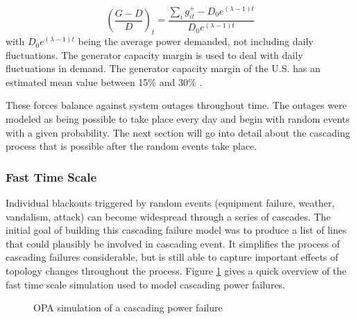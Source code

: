 \begin{enumerate}
\begin{equation}
\left(\frac{G-D}{D}\right)_t = \frac{\sum_i g_{it}^+ - D_0 e^{(\lambda-1)t} }{D_0 e^{(\lambda-1)t}}
\end{equation}
with $D_0 e^{(\lambda-1)t}$ being the average power demanded, not including daily fluctuations.  The generator capacity margin is used to deal with daily fluctuations in demand.  The generator capacity margin of the U.S. has an estimated mean value between 15\% and 30\% \cite{carreras_2004}.
\end{enumerate}

These forces balance against system outages throughout time.  The outages were modeled as being possible to take place every day and begin with random events with a given probability.  The next section will go into detail about the cascading process that is possible after the random events take place.

\subsubsection{Fast Time Scale}

Individual blackouts triggered by random events (equipment failure, weather, vandalism, attack) can become widespread through a series of cascades. 
The initial goal of building this cascading failure model was to produce a list of lines that could plausibly be involved in cascading event.  It simplifies the process of cascading failures considerable, but is still able to capture important effects of topology changes throughout the process.  Figure \ref{fig:cascade} gives a quick overview of the fast time scale simulation used to model cascading power failures.

\begin{figure}
\centering
{} 
\caption{OPA simulation of a cascading power failure}
  \label{fig:cascade}
\end{figure}


